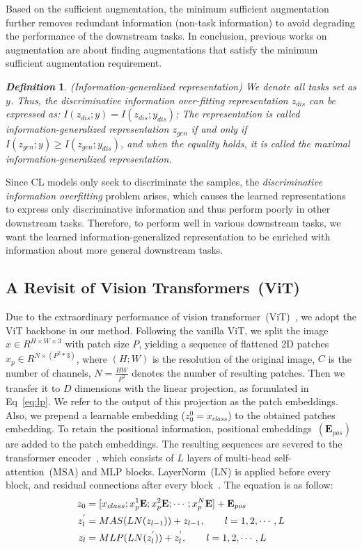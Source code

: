 \documentclass[10pt,twocolumn,letterpaper]{article}
\newtheorem{myDef}{\textit{Definition}}
\begin{document}
Based on the sufficient augmentation, the minimum sufficient augmentation further removes redundant information (non-task information) to avoid degrading the performance of the downstream tasks. In conclusion, previous works on augmentation are about finding augmentations that satisfy the minimum sufficient augmentation requirement.

\begin{myDef}\label{representation}
(Information-generalized representation) We denote all tasks set as $y$. Thus, the discriminative information over-fitting representation $z_{dis}$ can be expressed as: $I(z_{dis};y)=I(z_{dis};y_{dis})$; The representation is called information-generalized representation $z_{gen}$ if and only if $I(z_{gen};y)\ge I(z_{gen};y_{dis})$, and when the equality holds, it is called the maximal information-generalized representation.
\end{myDef}

Since CL models only seek to discriminate the samples, the \textit{discriminative information overfitting} problem arises, which causes the learned representations to express only discriminative information and thus perform poorly in other downstream tasks. Therefore, to perform well in various downstream tasks, we want the learned information-generalized representation to be enriched with information about more general downstream tasks.
\subsection{A Revisit of Vision Transformers~(ViT)}
Due to the extraordinary performance of vision transformer~(ViT)~\cite{dosovitskiy2020image}, we adopt the ViT backbone in our method. Following the vanilla ViT, we split the image $x\in R^{H\times W\times 3}$ with patch size $P$, yielding a sequence of flattened 2D patches $x_p\in R^{N\times(P^2*3)}$, where $(H;W)$ is the resolution of the original image, $C$ is the number of channels, $N=\frac{HW}{P^2}$ denotes the number of resulting patches. Then we transfer it to $D$ dimensions with the linear projection, as formulated in Eq~\ref{eq:lp}. We refer to the output of this projection as the patch embeddings. Also, we prepend a learnable embedding ($z_0^0=x_{class}$) to the obtained patches embedding. To retain the positional information, positional embeddings~$(\mathbf{E}_{pos})$ are added to the patch embeddings. The resulting sequences are severed to the transformer encoder~\cite{vaswani2017attention}, which consists of $L$ layers of multi-head self-attention~(MSA) and MLP blocks. LayerNorm~(LN) is applied before every block, and residual connections after every block~\cite{baevski2018adaptive,wang2019learning}. The equation is as follow:
\begin{align}
\footnotesize
    z_0&=[x_{class};x^1_{p}\mathbf{E};x^2_{p}\mathbf{E};\cdots;x^N_{p}\mathbf{E}]+\mathbf{E}_{pos}\label{eq:lp}\\
    z^{'}_l&=MAS(LN(z_{l-1}))+z_{l-1},\qquad l=1,2,\cdots,L \label{eq:msa}\\
    z_l& = MLP(LN(z^{'}_l))+z^{'}_l,\qquad l=1,2,\cdots,L \label{eq:mlp}
\end{align}
\end{document}
